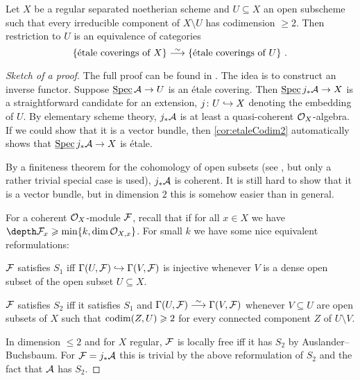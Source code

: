 \begin{thm}
	Let $X$ be a regular separated noetherian scheme and $U\subseteq X$ an open subscheme such that every irreducible component of $X\setminus U$ has codimension $\geq 2$. Then restriction to $U$ is an equivalence of categories
	\begin{equation*}
		\left\{\text{étale coverings of $X$}\right\}\isomorphism\left\{\text{étale coverings of $U$}\right\}\,.
	\end{equation*}
\end{thm}
\begin{proof}[Sketch of a proof]
	The full proof can be found in \cite[Exposé~X Théorème~3.4]{sga1}. The idea is to construct an inverse functor. Suppose $\SPEC\Aa\morphism U$ is an étale covering. Then $\SPEC j_*\Aa\morphism X$ is a straightforward candidate for an extension, $j\colon U\monomorphism X$ denoting the embedding of $U$. By elementary scheme theory, $j_*\mathcal{A}$ is at least a quasi-coherent $\mathcal{O}_X$-algebra. If we could show that it is a vector bundle, then \cref{cor:etaleCodim2} automatically shows that $\SPEC j_*\Aa\morphism X$ is étale.
	
	By  a finiteness theorem for the cohomology of open subsets (see \cite{sga2}, but only a rather trivial special case is used), $j_*\mathcal{A}$ is coherent. It is still hard to show that it is a vector bundle, but in dimension $2$ this is somehow easier than in general.
	
	For a coherent $\mathcal{O}_X$-module $\mathcal{F}$, recall that  if for all $x\in X$ we have $\depth\Ff_x\geq \min\{k,\dim\Oo_{X,x}\}$. For small $k$ we have some nice equivalent reformulations:
	\begin{numerate}
		\item $\mathcal{F}$ satisfies $S_1$ iff $\Gamma(U,\Ff)\monomorphism\Gamma(V,\Ff)$ is injective whenever $V$ is a dense open subset of the open subset $U\subseteq X$.
		\item $\mathcal{F}$ satisfies $S_2$ iff it satisfies $S_1$ and $\Gamma(U,\Ff)\isomorphism\Gamma(V,\Ff)$ whenever $V\subseteq U$ are open subsets of $X$ such that $\operatorname{codim}(Z,U)\geqslant 2$ for every connected component $Z$ of $U\setminus V$.
	\end{numerate}
	In dimension $\leq 2$ and for $X$ regular, $\mathcal{F}$ is locally free iff it has $S_2$ by Auslander--Buchsbaum. For $\mathcal{F}=j_*\mathcal{A}$ this is trivial by the above reformulation of $S_2$ and the fact that $\mathcal{A}$ has $S_2$.
	

\end{proof}
